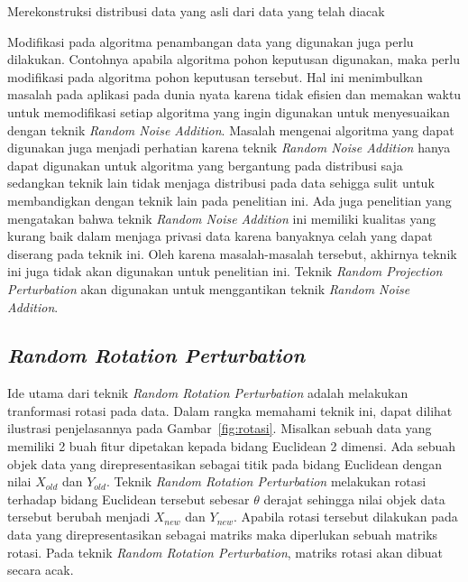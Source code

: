 \begin{algorithm}
	\DontPrintSemicolon\SetAlgoNoLine\LinesNumbered
	
	\setcounter{AlgoLine}{0}

	\caption{Merekonstruksi distribusi data yang asli dari data yang telah diacak}
	\label{alg:rekonstruksi}
\end{algorithm}

Modifikasi pada algoritma penambangan data yang digunakan juga perlu dilakukan. Contohnya apabila algoritma pohon keputusan digunakan, maka perlu modifikasi pada algoritma pohon keputusan tersebut. Hal ini menimbulkan masalah pada aplikasi pada dunia nyata karena tidak efisien dan memakan waktu untuk memodifikasi setiap algoritma yang ingin digunakan untuk menyesuaikan dengan teknik \textit{Random Noise Addition}. Masalah mengenai algoritma yang dapat digunakan juga menjadi perhatian karena teknik \textit{Random Noise Addition} hanya dapat digunakan untuk algoritma yang bergantung pada distribusi saja sedangkan teknik lain tidak menjaga distribusi pada data sehigga sulit untuk membandigkan dengan teknik lain pada penelitian ini. Ada juga penelitian yang mengatakan bahwa teknik \textit{Random Noise Addition} ini memiliki kualitas yang kurang baik dalam menjaga privasi data karena banyaknya celah yang dapat diserang pada teknik ini. Oleh karena masalah-masalah tersebut, akhirnya teknik ini juga tidak akan digunakan untuk penelitian ini. Teknik \textit{Random Projection Perturbation} akan digunakan untuk menggantikan teknik \textit{Random Noise Addition}.

\subsection{\textit{Random Rotation Perturbation}}
\label{subsec:rrp}

Ide utama dari teknik \textit{Random Rotation Perturbation} adalah melakukan tranformasi rotasi pada data. Dalam rangka memahami teknik ini, dapat dilihat ilustrasi penjelasannya pada Gambar~\ref{fig:rotasi}. Misalkan sebuah data yang memiliki 2 buah fitur dipetakan kepada bidang Euclidean 2 dimensi. Ada sebuah objek data yang direpresentasikan sebagai titik pada bidang Euclidean dengan nilai \(X_{old}\) dan \(Y_{old}\). Teknik \textit{Random Rotation Perturbation} melakukan rotasi terhadap bidang Euclidean tersebut sebesar \(\theta\) derajat sehingga nilai objek data tersebut berubah menjadi \(X_{new}\) dan \(Y_{new}\). Apabila rotasi tersebut dilakukan pada data yang direpresentasikan sebagai matriks maka diperlukan sebuah matriks rotasi. Pada teknik \textit{Random Rotation Perturbation}, matriks rotasi akan dibuat secara acak.

